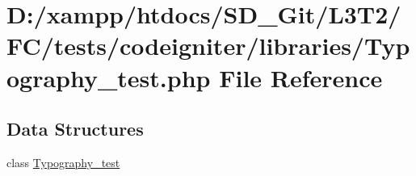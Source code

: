 \hypertarget{tests_2codeigniter_2libraries_2_typography__test_8php}{}\section{D\+:/xampp/htdocs/\+S\+D\+\_\+\+Git/\+L3\+T2/\+F\+C/tests/codeigniter/libraries/\+Typography\+\_\+test.php File Reference}
\label{tests_2codeigniter_2libraries_2_typography__test_8php}
\subsection*{Data Structures}
\begin{DoxyCompactItemize}
\item 
class \hyperlink{class_typography__test}{Typography\+\_\+test}
\end{DoxyCompactItemize}
